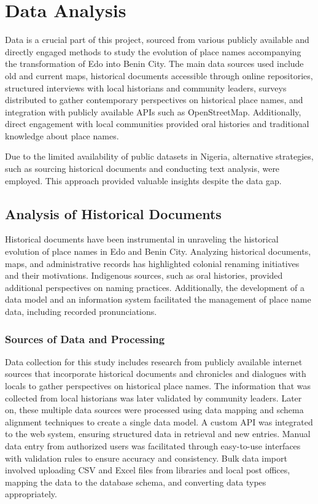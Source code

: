 \chapter{Data Analysis}
Data is a crucial part of this project, sourced from various publicly available and directly engaged methods to study the evolution of place names accompanying the transformation of Edo into Benin City. The main data sources used include old and current maps, historical documents accessible through online repositories, structured interviews with local historians and community leaders, surveys distributed to gather contemporary perspectives on historical place names, and integration with publicly available APIs such as OpenStreetMap. Additionally, direct engagement with local communities provided oral histories and traditional knowledge about place names.

Due to the limited availability of public datasets in Nigeria, alternative strategies, such as sourcing historical documents and conducting text analysis, were employed. This approach provided valuable insights despite the data gap.

\section{Analysis of Historical Documents}

Historical documents have been instrumental in unraveling the historical evolution of place names in Edo and Benin City. Analyzing historical documents, maps, and administrative records has highlighted colonial renaming initiatives and their motivations. Indigenous sources, such as oral histories, provided additional perspectives on naming practices. Additionally, the development of a data model and an information system facilitated the management of place name data, including recorded pronunciations.

\subsection{Sources of Data and Processing}

Data collection for this study includes research from publicly available internet sources that incorporate historical documents and chronicles and dialogues with locals to gather perspectives on historical place names. The information that was collected from local historians was later validated by community leaders. Later on, these multiple data sources were processed using data mapping and schema alignment techniques to create a single data model. A custom API was integrated to the web system, ensuring structured data in retrieval and new entries. Manual data entry from authorized users was facilitated through easy-to-use interfaces with validation rules to ensure accuracy and consistency. Bulk data import involved uploading CSV and Excel files from libraries and local post offices, mapping the data to the database schema, and converting data types appropriately.

